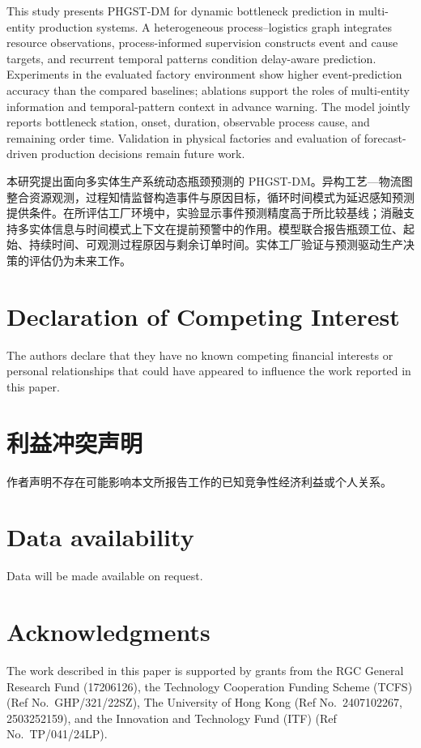\documentclass[a4paper,fleqn]{cas-dc}
\newcommand{\zhpara}[1]{%
  \par\begingroup\small\color{black!72}\noindent #1\par\endgroup}
\begin{document}
This study presents PHGST-DM for dynamic bottleneck prediction in multi-entity production systems. A heterogeneous process--logistics graph integrates resource observations, process-informed supervision constructs event and cause targets, and recurrent temporal patterns condition delay-aware prediction. Experiments in the evaluated factory environment show higher event-prediction accuracy than the compared baselines; ablations support the roles of multi-entity information and temporal-pattern context in advance warning. The model jointly reports bottleneck station, onset, duration, observable process cause, and remaining order time. Validation in physical factories and evaluation of forecast-driven production decisions remain future work.

\zhpara{本研究提出面向多实体生产系统动态瓶颈预测的 PHGST-DM。异构工艺—物流图整合资源观测，过程知情监督构造事件与原因目标，循环时间模式为延迟感知预测提供条件。在所评估工厂环境中，实验显示事件预测精度高于所比较基线；消融支持多实体信息与时间模式上下文在提前预警中的作用。模型联合报告瓶颈工位、起始、持续时间、可观测过程原因与剩余订单时间。实体工厂验证与预测驱动生产决策的评估仍为未来工作。}


\printcredits

\section*{Declaration of Competing Interest}
The authors declare that they have no known competing financial interests or personal relationships that could have appeared to influence the work reported in this paper.

\zhpara{\section*{利益冲突声明}
作者声明不存在可能影响本文所报告工作的已知竞争性经济利益或个人关系。}


\section*{Data availability}
Data will be made available on request.

\section*{Acknowledgments}
The work described in this paper is supported by grants from the RGC General Research Fund (17206126), the Technology Cooperation Funding Scheme (TCFS) (Ref No.\ GHP/321/22SZ), The University of Hong Kong (Ref No.\ 2407102267, 2503252159), and the Innovation and Technology Fund (ITF) (Ref No.\ TP/041/24LP).
\end{document}
